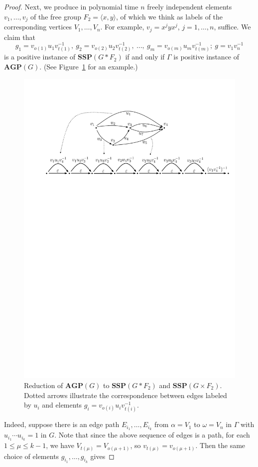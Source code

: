 \documentclass[10pt]{amsart}
\theoremstyle{definition}
\def\SSP{{\mathbf{SSP}}}
\def\AGP{{\mathbf{AGP}}}
\begin{document}
\begin{proof}
Next, we produce in polynomial time $n$ freely independent elements $v_1,\ldots, v_j$ of the free group $F_2= \langle x, y \rangle$, of which we think as labels of the corresponding vertices $V_1,\ldots, V_n$. For example, $v_j=x^jyx^j$, $j=1,\ldots,n$, suffice.
We claim that
$$g_1 = v_{o(1)}u_1v_{t(1)}^{-1},\ g_2=v_{o(2)}u_2v_{t(2)}^{-1},\ \ldots,\ g_m=v_{o(m)}u_mv_{t(m)}^{-1};\ g=v_{1}v_{n}^{-1}
$$
is a positive instance of $\SSP(G\ast F_2)$ if and only if $\Gamma$ is positive instance of $\AGP(G)$. (See Figure~\ref{fi:agp_to_ssp} for an example.)
\begin{figure}[h]
 \centering
 \includegraphics[width=4.5in]{agp_to_ssp}
 \caption{Reduction of $\AGP(G)$ to $\SSP(G\ast F_2)$ and $\SSP(G\times F_2)$. Dotted arrows illustrate the correspondence between edges labeled by $u_i$ and elements $g_i=v_{o(i)}u_iv_{t(i)}^{-1}$.}\label{fi:agp_to_ssp}
\end{figure}
Indeed, suppose there is an edge path $E_{i_1}, \ldots, E_{i_k}$ from $\alpha=V_1$ to $\omega=V_n$ in $\Gamma$ with $u_{i_1}\cdots u_{i_k}=1$ in $G$. Note that since the above sequence of edges is a path, for each $1\le \mu\le k-1$, we have $V_{t(\mu)}=V_{o(\mu+1)}$, so $v_{t(\mu)}=v_{o(\mu+1)}$. Then the same choice of elements $g_{i_1},\ldots, g_{i_k}$ gives

\end{proof}
\end{document}
